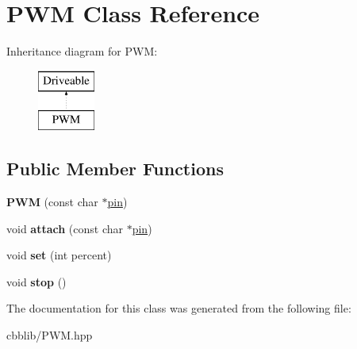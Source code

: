 \hypertarget{classPWM}{\section{\-P\-W\-M \-Class \-Reference}
\label{classPWM}
}
\-Inheritance diagram for \-P\-W\-M\-:\begin{figure}[H]
\begin{center}
\leavevmode
\includegraphics[height=2.000000cm]{classPWM}
\end{center}
\end{figure}
\subsection*{\-Public \-Member \-Functions}
\begin{DoxyCompactItemize}
\item 
\hypertarget{classPWM_a8d6eae304a9a4159435f148f500da20c}{{\bfseries \-P\-W\-M} (const char $\ast$\hyperlink{structpin}{pin})}\label{classPWM_a8d6eae304a9a4159435f148f500da20c}

\item 
\hypertarget{classPWM_aa687afe44571fa1f653684466752fc8a}{void {\bfseries attach} (const char $\ast$\hyperlink{structpin}{pin})}\label{classPWM_aa687afe44571fa1f653684466752fc8a}

\item 
\hypertarget{classPWM_a8c356c741c8c9b54d8aea1c4f65e5e81}{void {\bfseries set} (int percent)}\label{classPWM_a8c356c741c8c9b54d8aea1c4f65e5e81}

\item 
\hypertarget{classPWM_a0aeb2f45ef4e3139e7f3432c0c90c846}{void {\bfseries stop} ()}\label{classPWM_a0aeb2f45ef4e3139e7f3432c0c90c846}

\end{DoxyCompactItemize}


\-The documentation for this class was generated from the following file\-:\begin{DoxyCompactItemize}
\item 
cbblib/\-P\-W\-M.\-hpp\end{DoxyCompactItemize}
